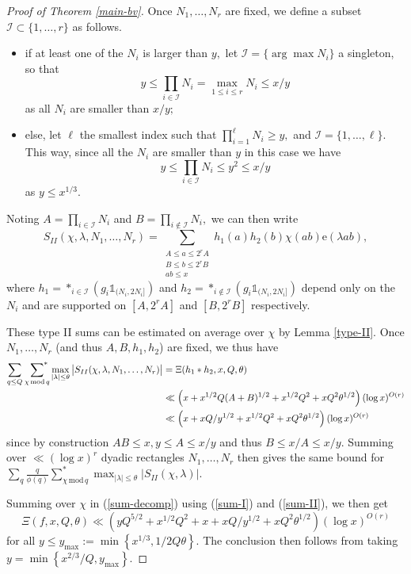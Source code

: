 \documentclass{article}
\newcommand{\Mod}{\,\mathrm{mod}\,}
\newcommand{\e}{\mathrm{e}}
\newcommand{\I}{\mathcal{I}}
\newcommand{\Ind}{\mathbb{1}}
\newcommand{\starsum}{\ \sideset{}{^*}\sum}
\begin{document}
\begin{proof}[Proof of Theorem \ref{main-bv}]
    Once $N_1, \ldots, N_r$ are fixed, we define a subset $\I \subset \{1,\ldots, r\}$ as follows.
    \begin{itemize}
        \item if at least one of the $N_i$ is larger than $y,$ let $\I = \{\arg\max N_i\}$ a singleton, so that $$y \le \prod_{i\in \I} N_i = \max_{1\le i\le r} N_i \le x/y$$
        as all $N_i$ are smaller than $x/y;$
        \item else, let $\ell$ the smallest index such that $\prod_{i=1}^\ell N_i \ge y,$ and $\I = \{1,\ldots, \ell\}.$ This way, since all the $N_i$ are smaller than $y$ in this case we have $$y \le \prod_{i\in\I} N_i \le y^2 \le x/y$$ as $y\le x^{1/3}.$
    \end{itemize}

    Noting $A = \prod_{i\in\I} N_i$ and $B = \prod_{i\not\in\I} N_i,$ we can then write 
    $$S_{II}(\chi, \lambda, N_1, \ldots, N_r) = \sum_{\substack{A\le a \le 2^rA \\ B\le b\le 2^rB \\ ab \le x}} h_1(a) h_2(b) \chi(ab) \e(\lambda ab),$$
    where $h_1 = \ast_{i\in\I} \left(g_i\Ind_{(N_i, 2N_i]}\right)$ and $h_2 = \ast_{i\not\in\I} \left(g_i\Ind_{(N_i, 2N_i]}\right)$ depend only on the $N_i$ and are supported on $[A, 2^rA]$ and $[B, 2^rB]$ respectively.

    These type II sums can be estimated on average over $\chi$ by Lemma \ref{type-II}. Once $N_1,\ldots, N_r$ (and thus $A, B, h_1, h_2$) are fixed, we thus have
    \begin{align}
        \sum_{q\le Q} \starsum_{\chi\Mod q} \max_{|\lambda|\le\theta} \big|S_{II}(\chi,\lambda, N_1, \ldots, N_r)\big| &= \Xi(h_1 * h_2, x, Q, \theta) \notag 
        \\&\ll \left(x + x^{1/2}Q(A+B)^{1/2} + x^{1/2}Q^2 + xQ^2\theta^{1/2}\right)(\log x)^{O(r)} \notag
        \\&\ll \left(x + xQ/y^{1/2} + x^{1/2}Q^2 + xQ^2\theta^{1/2}\right)(\log x)^{O(r)}\label{sum-II}
    \end{align}
    since by construction $AB\le x, y\le A\le x/y$ and thus $B\le x/A \le x/y.$ Summing over $\ll (\log x)^r$ dyadic rectangles $N_1,\ldots, N_r$ then gives the same bound for $\sum_q \frac{q}{\phi(q)} \sum_{\chi\Mod q}^* \max_{|\lambda|\le\theta} \big|S_{II}(\chi,\lambda)\big|.$

    Summing over $\chi$ in (\ref{sum-decomp}) using (\ref{sum-I}) and (\ref{sum-II}), we then get $$\Xi(f,x, Q, \theta)\ll \left(yQ^{5/2} + x^{1/2}Q^2 + x + xQ/y^{1/2} + xQ^2\theta^{1/2}\right) (\log x)^{O(r)}$$ for all $y\le y_{\max} := \min\left\{x^{1/3}, 1/2Q\theta\right\}.$ The conclusion then follows from taking $y = \min\left\{x^{2/3}/Q, y_{\max}\right\}.$
\end{proof}
\end{document}
